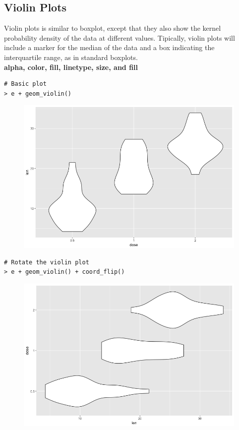 \subsection{Violin Plots}
Violin plots is similar to boxplot, except that they also show the kernel probability density of the data at different values. Tipically, violin plots will include a marker for the median of the data and a box indicating the interquartile range, as in standard boxplots.\newline
\\
\textbf{alpha, color, fill, linetype, size, and fill}
\begin{lstlisting}[language=html]
# Basic plot
> e + geom_violin()
\end{lstlisting}
\begin{figure}[H]\begin{center}\includegraphics[scale=1 ]{ilu/bg89.png}\end{center}\end{figure}
\begin{lstlisting}[language=html]
# Rotate the violin plot
> e + geom_violin() + coord_flip()
\end{lstlisting}
\begin{figure}[H]\begin{center}\includegraphics[scale=1 ]{ilu/bg90.png}\end{center}\end{figure}
